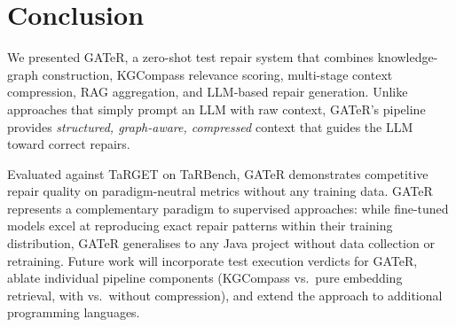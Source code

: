 \documentclass[conference,10pt]{IEEEtran}
\begin{document}
\section{Conclusion}
\label{sec:conclusion}

We presented GATeR, a zero-shot test repair system that combines
knowledge-graph construction, KGCompass relevance scoring, multi-stage
context compression, RAG aggregation, and LLM-based repair generation.
Unlike approaches that simply prompt an LLM with raw context, GATeR's
pipeline provides \emph{structured, graph-aware, compressed} context
that guides the LLM toward correct repairs.

Evaluated against TaRGET on TaRBench, GATeR demonstrates competitive
repair quality on paradigm-neutral metrics without any training data.
GATeR represents a complementary paradigm to supervised approaches: while
fine-tuned models excel at reproducing exact repair patterns within their
training distribution, GATeR generalises to any Java project without data
collection or retraining. Future work will incorporate test execution
verdicts for GATeR, ablate individual pipeline components (KGCompass
vs.\ pure embedding retrieval, with vs.\ without compression), and extend
the approach to additional programming languages.
\end{document}

